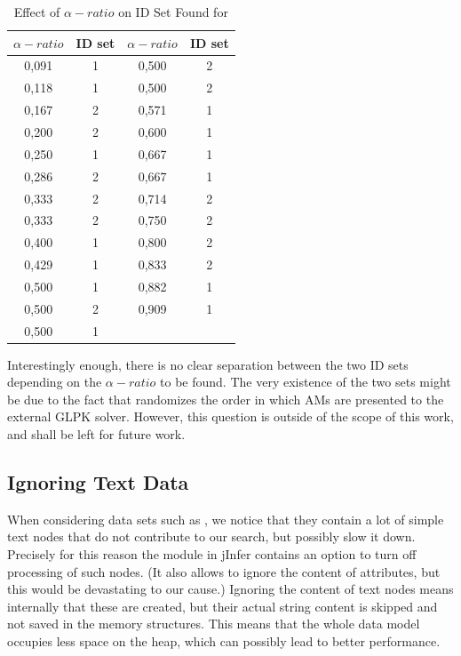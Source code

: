 \begin{table}
  \caption{Effect of $\alpha-ratio$ on ID Set Found for }
  \bigskip
  \label{table-experiments-various-betas-ova1-ratio-effect}
  \centering
  \begin{tabular}{c | c || c |  c}
    $\alpha-ratio$ & ID set & $\alpha-ratio$ & ID set \\
    \hline
    0,091	& 1 & 0,500	& 2 \\
    0,118	& 1 & 0,500	& 2 \\
    0,167	& 2 & 0,571	& 1 \\
    0,200	& 2 & 0,600	& 1 \\
    0,250	& 1 & 0,667	& 1 \\
    0,286	& 2 & 0,667	& 1 \\
    0,333	& 2 & 0,714	& 2 \\
    0,333	& 2 & 0,750	& 2 \\
    0,400	& 1 & 0,800	& 2 \\
    0,429	& 1 & 0,833	& 2 \\
    0,500	& 1 & 0,882	& 1 \\
    0,500	& 2 & 0,909	& 1 \\
    0,500	& 1 &       &   \\
  \end{tabular}
\end{table}

Interestingly enough, there is no clear separation between the two ID sets depending on the $\alpha-ratio$ to be found. The very existence of the two sets might be due to the fact that  randomizes the order in which AMs are presented to the external GLPK solver. However, this question is outside of the scope of this work, and shall be left for future work.

\subsection{Ignoring Text Data}


When considering data sets such as , we notice that they contain a lot of simple text nodes that do not contribute to our search, but possibly slow it down. Precisely for this reason the  module in jInfer contains an option to turn off processing of such nodes. (It also allows to ignore the content of attributes, but this would be devastating to our cause.) Ignoring the content of text nodes means internally that these are created, but their actual string content is skipped and not saved in the memory structures. This means that the whole data model occupies less space on the heap, which can possibly lead to better performance.

